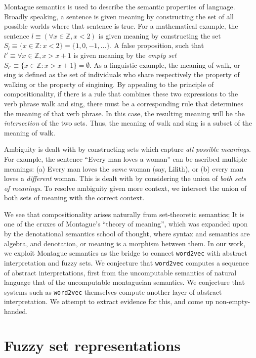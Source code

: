 \documentclass[11pt]{book}
\newcommand{\Z}{\ensuremath{\mathbb Z}}
\begin{document}
Montague semantics is used to describe the semantic properties of language.
Broadly speaking, a sentence is given meaning by constructing the set of all
possible worlds where that sentence is true. For a mathematical example, the
sentence $l \equiv (\forall x \in \Z, x < 2)$ is given meaning by constructing
the set $S_l \equiv \{ x \in \Z : x < 2 \} = \{1, 0, -1, \dots \}$. A false
proposition, such that $l' \equiv \forall x \in \Z, x > x + 1$ is given meaning
by the \emph{empty set} $S_{l'} \equiv \{ x \in \Z: x > x + 1 \} = \emptyset$.
As a linguistic example, the meaning of walk, or sing is  defined as the set of
individuals who share respectively the property of walking or the property of
singining.  By appealing to the principle of compositionality, if there is a
rule that combines these two expressions to the verb phrase walk and sing,
there must be a corresponding rule that determines the meaning of that verb
phrase. In this case, the resulting meaning will be the \emph{intersection} of
the two sets.  Thus, the meaning of walk and sing is a subset of the meaning of
walk.

Ambiguity is dealt with by constructing sets which capture \emph{all possible
meanings}.  For example, the sentence ``Every man loves a woman'' can be ascribed
multiple meanings: (a) Every man loves the \emph{same} woman (say, Lilith), or
(b) every man loves a \emph{different} woman. This is dealt with by considering
the union of \emph{both sets of meanings}. To resolve ambiguity given more
context, we intersect the union of both sets of meaning with the correct context.


We see that compositionality arises naturally from set-theoretic semantics; It
is one of the cruxes of Montague's ``theory of meaning'', which was expanded
upon by the denotational semantics school of thought, where syntax and
semantics are algebra, and denotation, or meaning is a morphism between them.
In our work, we exploit Montague semantics as the bridge to connect \texttt{word2vec} with
abstract interpretation and fuzzy sets. We conjecture that \texttt{word2vec}
computes a sequence of abstract interpretations, first from the uncomputable
semantics of natural language that of the uncomputable montagueian semantics.
We conjecture that systems such as \texttt{word2vec} themselves compute another
layer of abstract interpretation. We attempt to extract evidence for this, and
come up non-empty-handed.


\chapter{Fuzzy set representations}
\label{chapter:fuzzy-set-representation}
\end{document}
